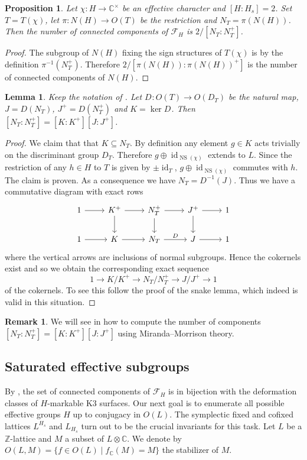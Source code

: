 \documentclass[a4paper]{amsart}
\theoremstyle{definition}
\newtheorem{remark}[definition]{Remark}
\theoremstyle{plain}
\newtheorem{lemma}[definition]{Lemma}
\newtheorem{proposition}[definition]{Proposition}
\DeclareMathOperator{\id}{id}
\DeclareMathOperator{\NS}{NS}
\newcommand{\CC}{\mathbb{C}}
\newcommand{\ZZ}{\mathbb{Z}}
\newcommand{\F}{\mathcal{F}}
\newcommand{\disc}[1]{{D_{#1}}}
\begin{document}
\begin{proposition}\label{quadruplewithtriple}
 Let $\chi \colon H \to \CC^\times$ be an effective character and $[H:H_s]=2$.
  Set $T = T(\chi)$, let $\pi \colon N(H) \to O(T)$ be the restriction and $N_T= \pi(N(H))$.
 Then the number of connected components of $\F_H$ is $2/[N_T:N_T^+]$.
\end{proposition}
\begin{proof}
  The subgroup of $N(H)$ fixing the sign structures of $T(\chi)$ is by the definition $\pi^{-1}(N_T^+)$.
Therefore $2/[\pi(N(H)):\pi(N(H))^+]$ is the number of connected components of $N(H)$.
\end{proof}

\begin{lemma}
 Keep the notation of .
 Let $\disc{} \colon O(T) \to O(\disc{T})$ be the natural map, $J =D(N_T)$, $J^+=D(N_T^+)$ and
 $K = \ker \disc{}$.
 Then $[N_T:N_T^+] = [K:K^+][J:J^+]$.
\end{lemma}
\begin{proof}
We claim that that $K \subseteq N_T$. By definition any element $g\in K$ acts trivially on the discriminant group $\disc{T}$. Therefore $g\oplus \id_{\NS(\chi)}$ extends to $L$. Since the restriction of any $h\in H$ to $T$ is given by $\pm \id_{T}$, $g \oplus \id_{\NS(\chi)}$ commutes with $h$. The claim is proven.
As a consequence we have $N_T = \disc{}^{-1}(J)$.
Thus we have a commutative diagram with exact rows
\[
\begin{tikzcd}
  1\arrow[r]& K^+ \arrow[r]\arrow[d] &N_T^+ \arrow[r]\arrow[d]& J^+\arrow[r]\arrow[d] & 1\\
1\arrow[r]& K\arrow[r] &N_T\arrow[r]{}{D} & J \arrow[r] &1
\end{tikzcd}\]
where the vertical arrows are inclusions of normal subgroups.
Hence the cokernels exist and so
we obtain the corresponding exact sequence
\[1 \to K/K^+ \to N_T/N_T^+ \to J/J^+ \to 1\]
of the cokernels. To see this follow the proof of the snake lemma, which indeed is valid in this situation.
%
%
%
%
%
%
%
%
%
\end{proof}


\begin{remark}\label{rem:mmapplication}
We will see in 
how to compute the number of components $[N_T:N_T^+]=[K:K^+][J:J^+]$ using Miranda--Morrison theory.
\end{remark}


\subsection{Saturated effective subgroups}\label{HpolEnum}
By , the set of connected components of $\F_H$ is in bijection with the deformation classes of $H$-markable K3 surfaces.
Our next goal is to enumerate all possible effective groups $H$ up to conjugacy in $O(L)$.
The symplectic fixed and cofixed lattices $L^{H_s}$ and $L_{H_s}$ turn out to be the crucial invariants for this task.
Let $L$ be a $\ZZ$-lattice and $M$ a subset of $L \otimes \CC$. We denote by $O(L,M)=\{f \in O(L) \mid f_\CC(M)=M\}$ the stabilizer of $M$.
\end{document}
